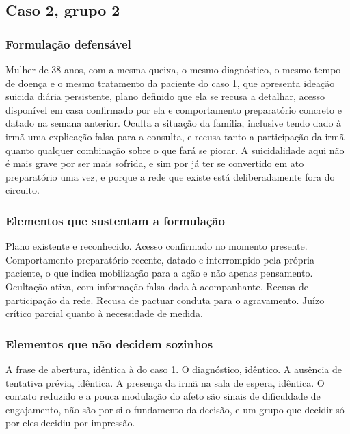 \filete

\subsection*{Caso 2, grupo 2}

\subsubsection*{Formulação defensável}

Mulher de 38 anos, com a mesma queixa, o mesmo diagnóstico, o mesmo tempo de doença e o mesmo tratamento da paciente do caso 1, que apresenta ideação suicida diária persistente, plano definido que ela se recusa a detalhar, acesso disponível em casa confirmado por ela e comportamento preparatório concreto e datado na semana anterior. Oculta a situação da família, inclusive tendo dado à irmã uma explicação falsa para a consulta, e recusa tanto a participação da irmã quanto qualquer combinação sobre o que fará se piorar. A suicidalidade aqui não é mais grave por ser mais sofrida, e sim por já ter se convertido em ato preparatório uma vez, e porque a rede que existe está deliberadamente fora do circuito.

\subsubsection*{Elementos que sustentam a formulação}

Plano existente e reconhecido. Acesso confirmado no momento presente. Comportamento preparatório recente, datado e interrompido pela própria paciente, o que indica mobilização para a ação e não apenas pensamento. Ocultação ativa, com informação falsa dada à acompanhante. Recusa de participação da rede. Recusa de pactuar conduta para o agravamento. Juízo crítico parcial quanto à necessidade de medida.

\subsubsection*{Elementos que não decidem sozinhos}

A frase de abertura, idêntica à do caso 1. O diagnóstico, idêntico. A ausência de tentativa prévia, idêntica. A presença da irmã na sala de espera, idêntica. O contato reduzido e a pouca modulação do afeto são sinais de dificuldade de engajamento, não são por si o fundamento da decisão, e um grupo que decidir só por eles decidiu por impressão.


